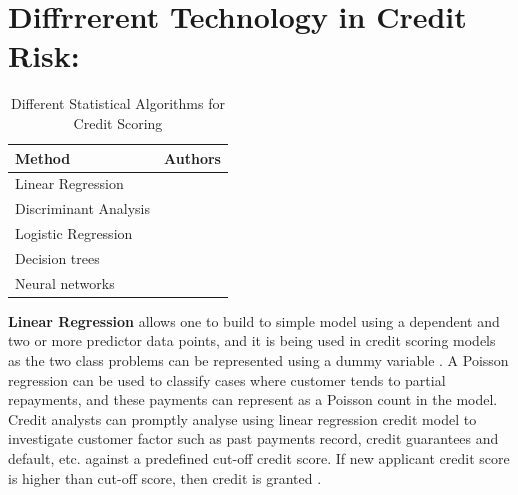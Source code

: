 {\section{Diffrrerent Technology in Credit Risk:}



\begin{table}[!ht]
\centering
\caption{Different Statistical Algorithms for Credit Scoring}
\label{my-label}
\begin{tabular}{|p{3cm}|p{10cm}|}
\toprule
\textbf{Method}                & \textbf{Authors}                                                                                                                                                       \\ \midrule
Linear Regression     & \cite{lee2005two,10.2307/2983268}                                                                                                                          \\
Discriminant Analysis & \cite{fisher1936use,durand1941risk,altman1968financial,eisenbeis1978problems,zhou2016research,liberati2017advances}                                        \\
Logistic Regression   & \cite{hosmer1989best,altland1999regression,nie2011credit,abdou2008neural,bensic2005modelling,joanes1993reject}                                             \\
Decision trees        & \cite{kohavi2002data,breiman1984classification,zhang2010vertical,zekic2004small,zhou2008new,huang2007credit,xia2017boosted,koh2015two,koutanaei2015hybrid} \\
Neural networks       & \cite{demuth2008neural,west2000neural,gately1995neural,presky1996functional,ghosh1994credit,desai1996comparison}                                           \\ \bottomrule
\end{tabular}
\end{table}
\textbf{Linear Regression} allows one to build to simple model using a dependent and two or more predictor data points, and it is being used in credit scoring models as the two class problems can be represented using a dummy variable \citep{lee2005two}. A Poisson regression can be used to classify cases where customer tends to partial repayments, and these payments can represent as a Poisson count in the model. Credit analysts can promptly analyse using linear regression credit model to investigate customer factor such as past payments record, credit guarantees and default, etc. against a predefined cut-off credit score. If new applicant credit score is higher than cut-off score, then credit is granted \citep{10.2307/2983268}.\\

}
